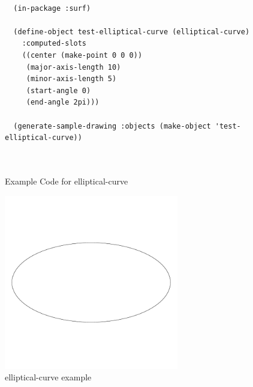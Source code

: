 \documentclass [11pt]{book}
\begin{document}
\begin{itemize}
\begin{figure}
\begin{lrbox}{\boxedverb}
\begin{minipage}{\linewidth}
{\small

\begin{verbatim}

  (in-package :surf)

  (define-object test-elliptical-curve (elliptical-curve)
    :computed-slots
    ((center (make-point 0 0 0)) 
     (major-axis-length 10) 
     (minor-axis-length 5) 
     (start-angle 0) 
     (end-angle 2pi)))
  
  (generate-sample-drawing :objects (make-object 'test-elliptical-curve))



\end{verbatim}}
\end{minipage}
\end{lrbox}
\fbox{\usebox{\boxedverb}}

\caption{Example Code for elliptical-curve}

\label{fig:example-code-elliptical-curve}

\end{figure}

\begin{figure}
\begin{center}
\includegraphics[width=3in,height=3in]{../images/example-elliptical-curve.pdf}
\end{center}

\caption{elliptical-curve example}

\label{fig:elliptical-curve}

\end{figure}







\end{itemize}
\end{document}
